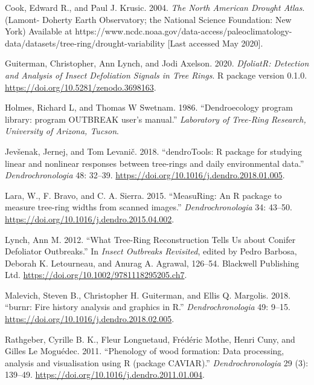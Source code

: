 \documentclass[review]{elsarticle} %
\begin{document}
\leavevmode\hypertarget{ref-Cook2004}{}%
Cook, Edward R., and Paul J. Krusic. 2004. \emph{The North American Drought Atlas}. (Lamont- Doherty Earth Observatory; the National Science Foundation: New York) Available at https://www.ncdc.noaa.gov/data-access/paleoclimatology-data/datasets/tree-ring/drought-variability {[}Last accessed May 2020{]}.

\leavevmode\hypertarget{ref-dfoliatR}{}%
Guiterman, Christopher, Ann Lynch, and Jodi Axelson. 2020. \emph{DfoliatR: Detection and Analysis of Insect Defoliation Signals in Tree Rings}. R package version 0.1.0. \url{https://doi.org/10.5281/zenodo.3698163}.

\leavevmode\hypertarget{ref-outbreak}{}%
Holmes, Richard L, and Thomas W Swetnam. 1986. ``Dendroecology program library: program OUTBREAK user's manual.'' \emph{Laboratory of Tree-Ring Research, University of Arizona, Tucson}.

\leavevmode\hypertarget{ref-Jevsenak2018}{}%
Jevšenak, Jernej, and Tom Levanič. 2018. ``dendroTools: R package for studying linear and nonlinear responses between tree-rings and daily environmental data.'' \emph{Dendrochronologia} 48: 32--39. \url{https://doi.org/10.1016/j.dendro.2018.01.005}.

\leavevmode\hypertarget{ref-Lara2015}{}%
Lara, W., F. Bravo, and C. A. Sierra. 2015. ``MeasuRing: An R package to measure tree-ring widths from scanned images.'' \emph{Dendrochronologia} 34: 43--50. \url{https://doi.org/10.1016/j.dendro.2015.04.002}.

\leavevmode\hypertarget{ref-Lynch2012}{}%
Lynch, Ann M. 2012. ``What Tree-Ring Reconstruction Tells Us about Conifer Defoliator Outbreaks.'' In \emph{Insect Outbreaks Revisited}, edited by Pedro Barbosa, Deborah K. Letourneau, and Anurag A. Agrawal, 126--54. Blackwell Publishing Ltd. \url{https://doi.org/10.1002/9781118295205.ch7}.

\leavevmode\hypertarget{ref-Malevich2018}{}%
Malevich, Steven B., Christopher H. Guiterman, and Ellis Q. Margolis. 2018. ``burnr: Fire history analysis and graphics in R.'' \emph{Dendrochronologia} 49: 9--15. \url{https://doi.org/10.1016/j.dendro.2018.02.005}.

\leavevmode\hypertarget{ref-Rathgeber2011}{}%
Rathgeber, Cyrille B. K., Fleur Longuetaud, Frédéric Mothe, Henri Cuny, and Gilles Le Moguédec. 2011. ``Phenology of wood formation: Data processing, analysis and visualisation using R (package CAVIAR).'' \emph{Dendrochronologia} 29 (3): 139--49. \url{https://doi.org/10.1016/j.dendro.2011.01.004}.
\end{document}
